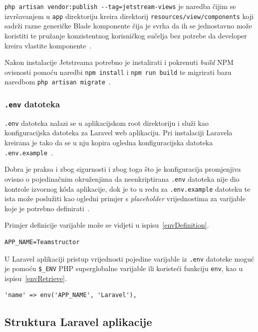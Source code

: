 \texttt{php artisan vendor:publish -{}-tag=jetstream-views} je naredba čijim se izvršavanjem u \texttt{app} direktoriju kreira direktorij \texttt{resources/view/components} koji sadrži razne generičke Blade komponente čija je svrha da ih se jednostavno može koristiti te pružanje konzistentnog korisničkog sučelja bez potrebe da developer kreira vlastite komponente~\cite{jetstreamLivewire}.

Nakon instalacije Jetstreama potrebno je instalirati i pokrenuti \textit{build} NPM ovisnosti pomoću naredbi \texttt{npm install} i \texttt{npm run build} te migrirati bazu naredbom \texttt{php artisan migrate}~\cite{jetstreamInstallation}.

\subsubsection{\texttt{.env} datoteka}
\texttt{.env} datoteka nalazi se u aplikacijskom root direktoriju i služi kao konfiguracijska datoteka za Laravel web aplikaciju. Pri instalaciji Laravela kreirana je tako da se u nju kopira ogledna konfiguracijska datoteka \texttt{.env.example}~\cite{configuration}. 

Dobra je praksa i zbog sigurnosti i zbog toga što je konfiguracija promjenjiva ovisno o pojedinačnim okruženjima da neenkriptirana \texttt{.env} datoteka nije dio kontrole izvornog k\^oda aplikacije, dok je to u redu za \texttt{.env.example} datoteku te ista može poslužiti kao ogledni primjer s \textit{placeholder} vrijednostima za varijable koje je potrebno definirati~\cite{configuration}.

Primjer definicije varijable može se vidjeti u ispisu~\ref{envDefinition}.

\begin{lstlisting}[caption={Definicija varijable u \texttt{.env datoteci}}, label=envDefinition]
APP_NAME=Teamstructor
\end{lstlisting}

U Laravel aplikaciji pristup vrijednosti pojedine varijable iz \texttt{.env} datoteke moguć je pomoću \texttt{\$\_ENV} PHP superglobalne varijable ili koristeći funkciju \texttt{env}, kao u ispisu~\ref{envRetrieve}.

\begin{lstlisting}[caption={Pristup vrijednosti \textit{environment} varijable u Laravelu}, label=envRetrieve]
'name' => env('APP_NAME', 'Laravel'),
\end{lstlisting}

\subsection{Struktura Laravel aplikacije}

